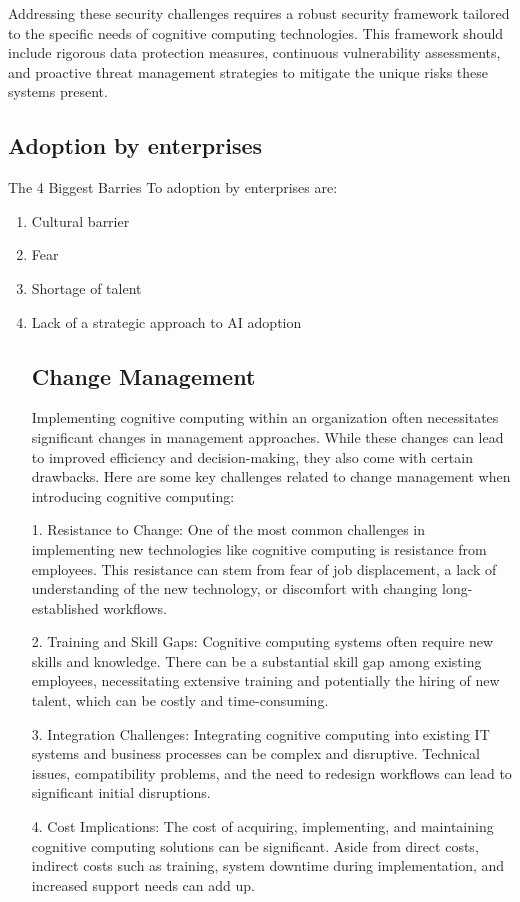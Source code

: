\documentclass{article}
\begin{document}
Addressing these security challenges requires a robust security framework tailored to the specific needs of cognitive computing technologies. This framework should include rigorous data protection measures, continuous vulnerability assessments, and proactive threat management strategies to mitigate the unique risks these systems present.


\subsection{Adoption by enterprises}
The 4 Biggest Barries To adoption by enterprises are:
\begin{enumerate}
	\item Cultural barrier 
	\item Fear
	\item Shortage of talent
	\item Lack of a strategic approach to AI adoption
\subsection{Change Management}
Implementing cognitive computing within an organization often necessitates significant changes in management approaches. While these changes can lead to improved efficiency and decision-making, they also come with certain drawbacks. Here are some key challenges related to change management when introducing cognitive computing:

1. Resistance to Change: One of the most common challenges in implementing new technologies like cognitive computing is resistance from employees. This resistance can stem from fear of job displacement, a lack of understanding of the new technology, or discomfort with changing long-established workflows.

2. Training and Skill Gaps: Cognitive computing systems often require new skills and knowledge. There can be a substantial skill gap among existing employees, necessitating extensive training and potentially the hiring of new talent, which can be costly and time-consuming.

3. Integration Challenges: Integrating cognitive computing into existing IT systems and business processes can be complex and disruptive. Technical issues, compatibility problems, and the need to redesign workflows can lead to significant initial disruptions.

4. Cost Implications: The cost of acquiring, implementing, and maintaining cognitive computing solutions can be significant. Aside from direct costs, indirect costs such as training, system downtime during implementation, and increased support needs can add up.


\end{enumerate}
\end{document}
